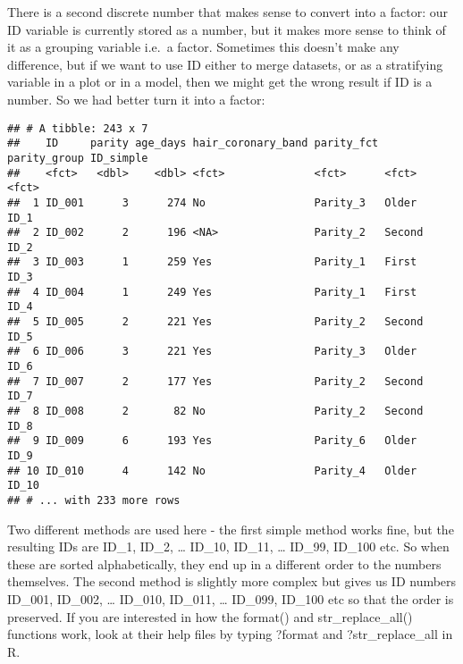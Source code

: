 \documentclass[
]{article}
\newenvironment{Shaded}{\begin{snugshade}}{\end{snugshade}}
\newcommand{\DataTypeTok}[1]{\textcolor[rgb]{0.13,0.29,0.53}{#1}}
\newcommand{\KeywordTok}[1]{\textcolor[rgb]{0.13,0.29,0.53}{\textbf{#1}}}
\newcommand{\NormalTok}[1]{#1}
\newcommand{\OperatorTok}[1]{\textcolor[rgb]{0.81,0.36,0.00}{\textbf{#1}}}
\newcommand{\StringTok}[1]{\textcolor[rgb]{0.31,0.60,0.02}{#1}}
\begin{document}
There is a second discrete number that makes sense to convert into a
factor: our ID variable is currently stored as a number, but it makes
more sense to think of it as a grouping variable i.e.~a factor.
Sometimes this doesn't make any difference, but if we want to use ID
either to merge datasets, or as a stratifying variable in a plot or in a
model, then we might get the wrong result if ID is a number. So we had
better turn it into a factor:

\begin{Shaded}
\end{Shaded}

\begin{verbatim}
## # A tibble: 243 x 7
##    ID     parity age_days hair_coronary_band parity_fct parity_group ID_simple
##    <fct>   <dbl>    <dbl> <fct>              <fct>      <fct>        <fct>    
##  1 ID_001      3      274 No                 Parity_3   Older        ID_1     
##  2 ID_002      2      196 <NA>               Parity_2   Second       ID_2     
##  3 ID_003      1      259 Yes                Parity_1   First        ID_3     
##  4 ID_004      1      249 Yes                Parity_1   First        ID_4     
##  5 ID_005      2      221 Yes                Parity_2   Second       ID_5     
##  6 ID_006      3      221 Yes                Parity_3   Older        ID_6     
##  7 ID_007      2      177 Yes                Parity_2   Second       ID_7     
##  8 ID_008      2       82 No                 Parity_2   Second       ID_8     
##  9 ID_009      6      193 Yes                Parity_6   Older        ID_9     
## 10 ID_010      4      142 No                 Parity_4   Older        ID_10    
## # ... with 233 more rows
\end{verbatim}

Two different methods are used here - the first simple method works
fine, but the resulting IDs are ID\_1, ID\_2, \ldots{} ID\_10, ID\_11,
\ldots{} ID\_99, ID\_100 etc. So when these are sorted alphabetically,
they end up in a different order to the numbers themselves. The second
method is slightly more complex but gives us ID numbers ID\_001,
ID\_002, \ldots{} ID\_010, ID\_011, \ldots{} ID\_099, ID\_100 etc so
that the order is preserved. If you are interested in how the format()
and str\_replace\_all() functions work, look at their help files by
typing ?format and ?str\_replace\_all in R.
\end{document}
